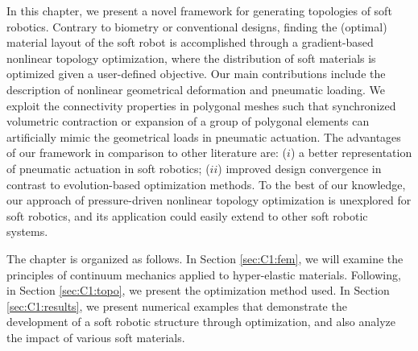 In this chapter, we present a novel framework for generating topologies of soft robotics. Contrary to biometry or conventional designs, finding the (optimal) material layout of the soft robot is accomplished through a gradient-based nonlinear topology optimization, where the distribution of soft materials is optimized given a user-defined objective. Our main contributions include the description of nonlinear geometrical deformation and pneumatic loading. We exploit the connectivity properties in polygonal meshes such that synchronized volumetric contraction or expansion of a group of polygonal elements can artificially mimic the geometrical loads in pneumatic actuation. The advantages of our framework in comparison to other literature are: ($i$) a better representation of pneumatic actuation in soft robotics; ($ii$) improved design convergence in contrast to evolution-based optimization methods. To the best of our knowledge, our approach of pressure-driven nonlinear topology optimization is unexplored for soft robotics, and its application could easily extend to other soft robotic systems.

The chapter is organized as follows. In Section \ref{sec:C1:fem}, we will examine the principles of continuum mechanics applied to hyper-elastic materials. Following, in Section \ref{sec:C1:topo}, we present the optimization method used. In Section \ref{sec:C1:results}, we present numerical examples that demonstrate the development of a soft robotic structure through optimization, and also analyze the impact of various soft materials.